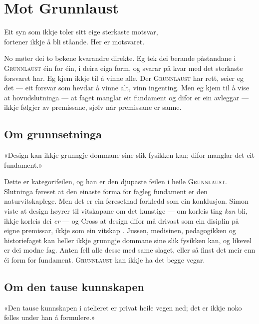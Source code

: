 \chapter{Mot Grunnlaust}

\begin{motto}
Eit syn som ikkje toler sitt eige sterkaste motsvar,\\ fortener ikkje å bli ståande. Her er motsvaret.
\end{motto}

No møter dei to bøkene kvarandre direkte. Eg tek dei berande påstandane i \textsc{Grunnlaust} éin for éin, i deira eiga form, og svarar på kvar med det sterkaste forsvaret har. Eg kjem ikkje til å vinne alle. Der \textsc{Grunnlaust} har rett, seier eg det — eit forsvar som hevdar å vinne alt, vinn ingenting. Men eg kjem til å vise at hovudslutninga — at faget manglar eit fundament og difor er ein avleggar — ikkje følgjer av premissane, sjølv når premissane er sanne.

\section{Om grunnsetninga}

\begin{innvending}
«Design kan ikkje grunngje dommane sine slik fysikken kan; difor manglar det eit fundament.»
\end{innvending}

\noindent Dette er kategorifeilen, og han er den djupaste feilen i heile \textsc{Grunnlaust}. Slutninga føreset at den einaste forma for fagleg fundament er den naturvitskaplege. Men det er ein føresetnad forkledd som ein konklusjon. Simon viste at design høyrer til vitskapane om det kunstige — om korleis ting \emph{kan} bli, ikkje korleis dei \emph{er} \autocite{simon1969sciences} — og Cross at design difor må drivast som ein disiplin på eigne premissar, ikkje som ein vitskap \autocite{cross2001discipline}. Jussen, medisinen, pedagogikken og historiefaget kan heller ikkje grunngje dommane sine slik fysikken kan, og likevel er dei modne fag. Anten fell alle desse med same slaget, eller så finst det meir enn éi form for fundament. \textsc{Grunnlaust} kan ikkje ha det begge vegar.

\section{Om den tause kunnskapen}

\begin{innvending}
«Den tause kunnskapen i atelieret er privat heile vegen ned; det er ikkje noko felles under han å formulere.»
\end{innvending}

